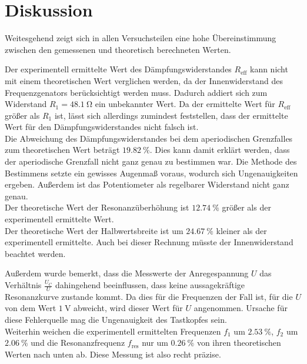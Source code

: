 \section{Diskussion}
\label{sec:Diskussion}

Weitesgehend zeigt sich in allen Versuchsteilen eine hohe Übereinstimmung 
zwischen den gemessenen und theoretisch berechneten Werten.

Der experimentell ermittelte Wert des Dämpfungswiderstandes $R_\text{eff}$ kann
nicht mit einem theoretischen Wert verglichen werden, da der Innenwiderstand 
des Frequenzgenators berücksichtigt werden muss. Dadurch addiert sich zum Widerstand
$R_1 = \SI{48.1}{\ohm}$ ein unbekannter Wert. Da der ermittelte Wert für $R_\text{eff}$
größer als $R_1$ ist, lässt sich allerdings zumindest feststellen, dass der ermittelte
Wert für den Dämpfungswiderstandes nicht falsch ist. \\
Die Abweichung des Dämpfungswiderstandes bei dem aperiodischen Grenzfalles zum 
theoretischen Wert beträgt $\SI{19.82}{\percent}$. Dies kann damit erklärt werden, 
dass der aperiodische Grenzfall nicht ganz genau zu bestimmen war. Die Methode 
des Bestimmens setzte ein gewisses Augenmaß voraus, wodurch sich Ungenauigkeiten 
ergeben. Außerdem ist das Potentiometer als regelbarer Widerstand nicht ganz 
genau. \\
Der theoretische Wert der Resonanzüberhöhung ist $\SI{12.74}{\percent}$ größer als der 
experimentell ermittelte Wert. \\
Der theoretische Wert der Halbwertsbreite ist um $\SI{24.67}{\percent}$ kleiner als der 
experimentell ermittelte. Auch bei dieser Rechnung müsste der Innenwiderstand
beachtet werden.

Außerdem wurde bemerkt, dass die Messwerte der Anregespannung $U$ das Verhältnis $\frac{U_C}{U}$
dahingehend beeinflussen, dass keine aussagekräftige Resonanzkurve zustande kommt. Da dies
für die Frequenzen der Fall ist, für die $U$ von dem Wert $\SI{1}{\volt}$ abweicht, wird
dieser Wert für $U$ angenommen. Ursache für diese Fehlerquelle mag die Ungenauigkeit des Tastkopfes
sein. \\
Weiterhin weichen die experimentell ermittelten Frequenzen $f_1$ um $\SI{2.53}{\percent}$,
$f_2$ um $\SI{2.06}{\percent}$ und die Resonanzfrequenz $f_\text{res}$ nur um $\SI{0.26}{\percent}$
von ihren theoretischen Werten nach unten ab. Diese Messung ist also recht präzise.
